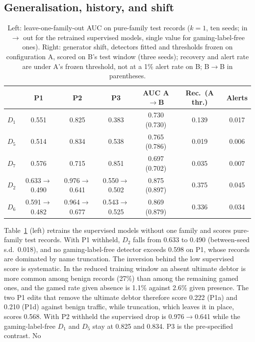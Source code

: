 \documentclass[conference]{IEEEtran}
\begin{document}
\subsection{Generalisation, history, and shift}
\begin{table}[!t]
\caption{Left: leave-one-family-out AUC on pure-family test records ($k=1$,
ten seeds; in $\rightarrow$ out for the retrained supervised models,
single value for gaming-label-free ones). Right: generator shift, detectors fitted
and thresholds frozen on configuration A, scored on B's test window (three
seeds); recovery and alert rate are under A's frozen threshold, not at a 1\%
alert rate on B; B$\rightarrow$B in parentheses.}
\label{tab:loo}
\centering
\scriptsize
\setlength{\tabcolsep}{2pt}
\begin{tabular}{@{}lccc|ccc@{}}
\toprule
 & P1 & P2 & P3 & AUC A$\rightarrow$B & Rec.\ (A thr.) & Alerts \\
\midrule
$D_1$ & 0.551 & 0.825 & 0.383 & 0.730 (0.730) & 0.139 & 0.017 \\
$D_5$ & 0.514 & 0.834 & 0.538 & 0.765 (0.786) & 0.019 & 0.006 \\
$D_7$ & 0.576 & 0.715 & 0.851 & 0.697 (0.702) & 0.035 & 0.007 \\
$D_2$ & 0.633$\rightarrow$0.490 & 0.976$\rightarrow$0.641 & 0.550$\rightarrow$0.502 & 0.875 (0.897) & 0.375 & 0.045 \\
$D_6$ & 0.591$\rightarrow$0.482 & 0.964$\rightarrow$0.677 & 0.543$\rightarrow$0.525 & 0.869 (0.879) & 0.336 & 0.034 \\
\bottomrule
\end{tabular}
\end{table}
Table~\ref{tab:loo} (left) retrains the supervised models without one
family and scores pure-family test records. With P1 withheld, $D_2$ falls from
0.633 to 0.490 (between-seed s.d.\ 0.018), and no
gaming-label-free detector exceeds 0.598 on P1, whose records are dominated
by name truncation. The inversion behind the low supervised score is
systematic. In the reduced training window an absent ultimate debtor is more
common among benign records (27\%) than among the remaining
gamed ones, and the gamed rate given absence is 1.1\% against
2.6\% given presence. The two P1 edits that remove the
ultimate debtor therefore score 0.222 (P1a) and 0.210
(P1d) against benign traffic, while truncation, which leaves it in place,
scores 0.568. With P2 withheld the supervised drop is
0.976$\rightarrow$0.641 while the gaming-label-free $D_1$ and $D_5$
stay at 0.825 and 0.834. P3 is the pre-specified contrast. No
\end{document}
